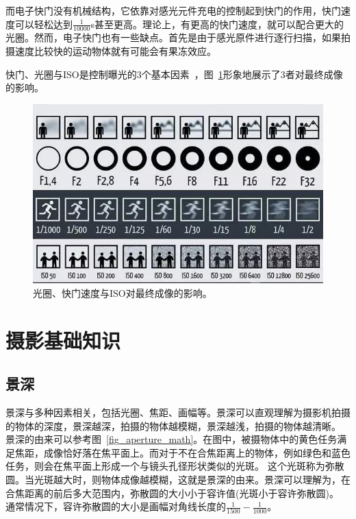 \documentclass{ctexart}
\begin{document}
而电子快门没有机械结构，它依靠对感光元件充电的控制起到快门的作用，快门速度可以轻松达到$\frac{1}{10000}$s甚至更高。理论上，有更高的快门速度，就可以配合更大的光圈。然而，电子快门也有一些缺点。首先是由于感光原件进行逐行扫描，如果拍摄速度比较快的运动物体就有可能会有果冻效应。

快门、光圈与ISO是控制曝光的3个基本因素~\cite{iso_aperture_shutter}，图~\ref{fig_iso_aperture_shutter}形象地展示了3者对最终成像的影响。

\begin{figure}[h!]
    \centering
    \includegraphics[width=.7\linewidth]{imgs/iso_aperture_shutter.jpg}
    \caption{光圈、快门速度与ISO对最终成像的影响。}
    \label{fig_iso_aperture_shutter}
\end{figure}

\section{摄影基础知识}

\subsection{景深~\cite{depth_of_field}}
景深与多种因素相关，包括光圈、焦距、画幅等。景深可以直观理解为摄影机拍摄的物体的深度，景深越深，拍摄的物体越模糊，景深越浅，拍摄的物体越清晰。
景深的由来可以参考图~\ref{fig_aperture_math}。在图中，被摄物体中的黄色任务满足焦距，成像恰好落在焦平面上。而对于不在合焦距离上的物体，例如绿色和蓝色任务，则会在焦平面上形成一个与镜头孔径形状类似的光斑。
这个光斑称为弥散圆。当光斑越大时，则物体成像越模糊，这就是景深的由来。景深可以理解为，在合焦距离的前后多大范围内，弥散圆的大小小于容许值(光斑小于容许弥散圆)。
通常情况下，容许弥散圆的大小是画幅对角线长度的$\frac{1}{1500} - \frac{1}{1000}$。
\end{document}
